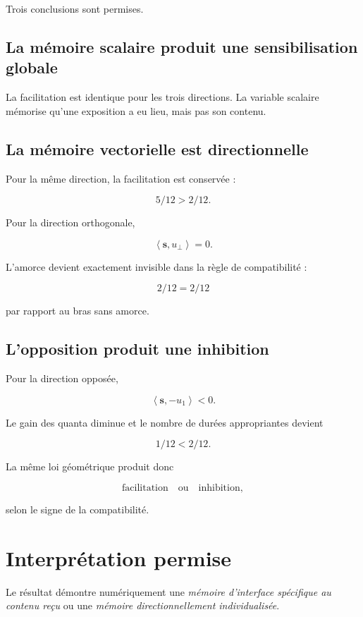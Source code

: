 Trois conclusions sont permises.

\subsection{La mémoire scalaire produit une sensibilisation globale}

La facilitation est identique pour les trois directions. La variable
scalaire mémorise qu'une exposition a eu lieu, mais pas son contenu.

\subsection{La mémoire vectorielle est directionnelle}

Pour la même direction, la facilitation est conservée :

\[
5/12>2/12.
\]

Pour la direction orthogonale,

\[
\left\langle\boldsymbol s,u_\perp\right\rangle=0.
\]

L'amorce devient exactement invisible dans la règle de compatibilité :

\[
2/12=2/12
\]

par rapport au bras sans amorce.

\subsection{L'opposition produit une inhibition}

Pour la direction opposée,

\[
\left\langle\boldsymbol s,-u_1\right\rangle<0.
\]

Le gain des quanta diminue et le nombre de durées appropriantes devient

\[
1/12<2/12.
\]

La même loi géométrique produit donc

\[
\boxed{
\text{facilitation}
\quad\text{ou}\quad
\text{inhibition},
}
\]

selon le signe de la compatibilité.

\section{Interprétation permise}
\label{annexe-num-interpretation-specificite}

Le résultat démontre numériquement une \emph{mémoire d'interface
spécifique au contenu reçu} ou une \emph{mémoire directionnellement
individualisée}.


